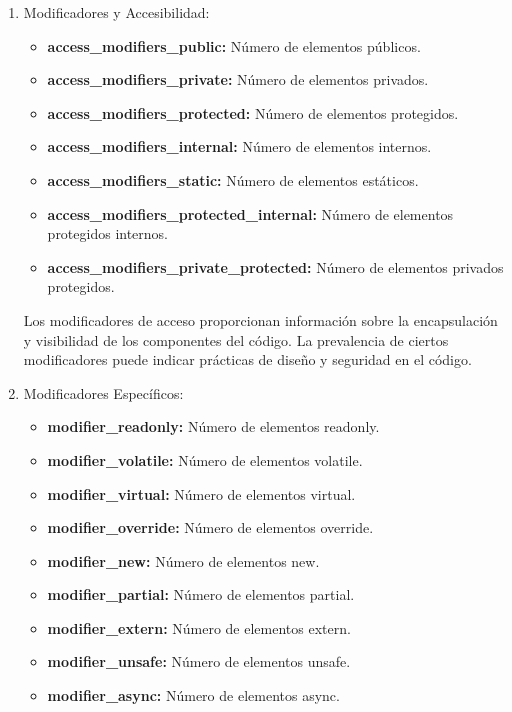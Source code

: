 \begin{enumerate}
    Las estructuras de control definen el flujo del programa y su lógica. Un mayor número de estructuras de control indica una lógica ramificada.

    \item Modificadores y Accesibilidad:
    \begin{itemize}
        \item {\bf access\_modifiers\_public:} Número de elementos públicos.
        \item {\bf access\_modifiers\_private:} Número de elementos privados.
        \item {\bf access\_modifiers\_protected:} Número de elementos protegidos.
        \item {\bf access\_modifiers\_internal:} Número de elementos internos.
        \item {\bf access\_modifiers\_static:} Número de elementos estáticos.
        \item {\bf access\_modifiers\_protected\_internal:} Número de elementos protegidos internos.
        \item {\bf access\_modifiers\_private\_protected:} Número de elementos privados protegidos.
    \end{itemize}
    Los modificadores de acceso proporcionan información sobre la encapsulación y visibilidad de los componentes del código. La prevalencia de ciertos modificadores puede indicar prácticas de diseño y seguridad en el código.

    \item Modificadores Específicos:
    \begin{itemize}
        \item {\bf modifier\_readonly:} Número de elementos readonly.
        \item {\bf modifier\_volatile:} Número de elementos volatile.
        \item {\bf modifier\_virtual:} Número de elementos virtual.
        \item {\bf modifier\_override:} Número de elementos override.
        \item {\bf modifier\_new:} Número de elementos new.
        \item {\bf modifier\_partial:} Número de elementos partial.
        \item {\bf modifier\_extern:} Número de elementos extern.
        \item {\bf modifier\_unsafe:} Número de elementos unsafe.
        \item {\bf modifier\_async:} Número de elementos async.
    \end{itemize}
    

\end{enumerate}
